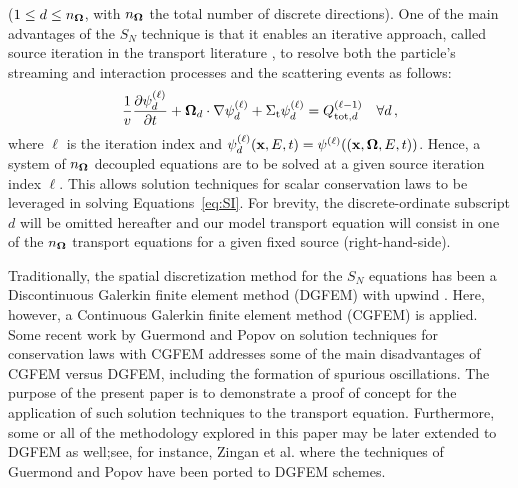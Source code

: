 ($1 \le d \le n_{\mathbf{\Omega}}$, with $n_{\mathbf{\Omega}}$ the total number of discrete directions). One of the
main advantages of the $S_N$ technique is that it enables an iterative approach, called source iteration
in the transport literature \cite{glasstone,SI refs}, to resolve
both the particle's streaming and interaction processes and the scattering events as follows:
\begin{equation} \label{eq:SI}
  \frac{1}{v}\frac{\partial \psi_d^{(\ell)}}{\partial t}
    + \mathbf{\Omega}_{d}\cdot\nabla\psi_d^{(\ell)}
    + \Sigma_\textup{t}\psi_d^{(\ell)} = Q_{\textup{tot},d}^{(\ell-1)} \quad \forall d \,,
\end{equation}
where $\ell$ is the iteration index and $\psi_d^{(\ell)}(\mathbf{x},E,t) = \psi^{(\ell)}((\mathbf{x},\mathbf{\Omega},E,t))$. 
Hence, a system of $n_{\mathbf{\Omega}}$ decoupled equations are to be solved
at a given source iteration index $\ell$. This allows solution techniques for scalar conservation
laws to be leveraged in solving Equations~\eqref{eq:SI}. For brevity, the discrete-ordinate subscript $d$
will be omitted hereafter and our model transport equation will consist in one of the $n_{\mathbf{\Omega}}$ transport
equations for a given fixed source (right-hand-side).

Traditionally, the spatial discretization method for the $S_N$
equations has been a Discontinuous Galerkin finite element method (DGFEM) with upwind
\cite{Lesaint1974}\cite{Reed_Hill_1973}. Here, however, 
a Continuous Galerkin finite element method (CGFEM) is applied.
Some recent work by Guermond and Popov \cite{guermond_ev} on
solution techniques for conservation laws with CGFEM addresses some
of the main disadvantages of CGFEM versus DGFEM, including the formation
of spurious oscillations. The purpose of the present paper is to demonstrate a proof of concept
for the application of such solution techniques to the transport equation.
Furthermore, some or all of the methodology explored in this paper may be
later extended to DGFEM as well;see, for instance, Zingan et al. \cite{zingan_2013}
where the techniques of Guermond and Popov \cite{guermond_ev} have been ported to DGFEM schemes.

